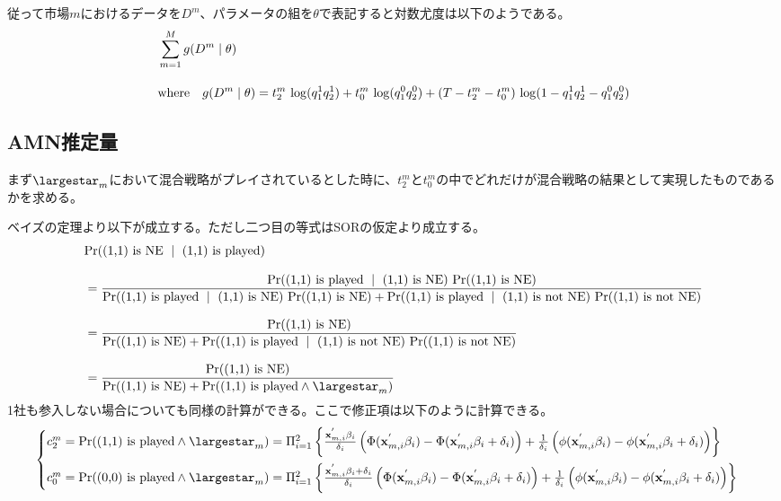 \documentclass{jsarticle}
\begin{document}
従って市場$m$におけるデータを$D^m$、パラメータの組を$\theta$で表記すると対数尤度は以下のようである。
\begin{align*}
	&\sum_{m = 1}^M g(D^m \mid \theta)\\[10pt]
	&\text{where}\quad g(D^m \mid \theta) = t_2^m\ {\rm log} (q_1^1 q_2^1) + t_0^m\ {\rm log} (q_1^0 q_2^0) + (T - t_2^m - t_0^m)\ {\rm log} (1- q_1^1 q_2^1 - q_1^0 q_2^0)
\end{align*}


\subsection{AMN推定量}
まず$\largestar_m$において混合戦略がプレイされているとした時に、$t_2^m$と$t_0^m$の中でどれだけが混合戦略の結果として実現したものであるかを求める。

ベイズの定理より以下が成立する。ただし二つ目の等式はSORの仮定より成立する。
\begin{align*}
	&{\rm Pr}(\text{(1,1) is NE}\ \mid\ \text{(1,1) is played}) \\[8pt]
	&= \frac{{\rm Pr}(\text{(1,1) is played}\ \mid\ \text{(1,1) is NE})\ {\rm Pr}(\text{(1,1) is NE})}{{\rm Pr}(\text{(1,1) is played}\ \mid\ \text{(1,1) is NE})\ {\rm Pr}(\text{(1,1) is NE}) + {\rm Pr}(\text{(1,1) is played}\ \mid\ \text{(1,1) is not NE})\ {\rm Pr}(\text{(1,1) is not NE})}\\[8pt]
	&= \frac{{\rm Pr}(\text{(1,1) is NE})}{{\rm Pr}(\text{(1,1) is NE}) + {\rm Pr}(\text{(1,1) is played}\ \mid\ \text{(1,1) is not NE})\ {\rm Pr}(\text{(1,1) is not NE})}\\[8pt]
	&= \frac{{\rm Pr}(\text{(1,1) is NE})}{{\rm Pr}(\text{(1,1) is NE}) + {\rm Pr}(\text{(1,1) is played} \wedge \largestar_m)}
\end{align*}
1社も参入しない場合についても同様の計算ができる。ここで修正項は以下のように計算できる。
\begin{align*}
\begin{cases}
	c_2^m = {\rm Pr}(\text{(1,1) is played} \wedge \largestar_m) = \Pi_{i = 1}^2 \left\{ \frac{{\bf x}_{m, i}^{'} \beta_i }{\delta_i} \left( \Phi({\bf x}_{m, i}^{'} \beta_i) - \Phi({\bf x}_{m, i}^{'} \beta_i  + \delta_i) \right) + \frac{1}{\delta_i} \left( \phi({\bf x}_{m, i}^{'} \beta_i ) - \phi({\bf x}_{m, i}^{'} \beta_i  + \delta_i) \right) \right\}\\[10pt]
	c_0^m = {\rm Pr}(\text{(0,0) is played} \wedge \largestar_m) = \Pi_{i = 1}^2 \left\{ \frac{{\bf x}_{m, i}^{'} \beta_i +\delta_i}{\delta_i} \left( \Phi({\bf x}_{m, i}^{'} \beta_i) - \Phi({\bf x}_{m, i}^{'} \beta_i  + \delta_i) \right) + \frac{1}{\delta_i} \left( \phi({\bf x}_{m, i}^{'} \beta_i ) - \phi({\bf x}_{m, i}^{'} \beta_i  + \delta_i) \right) \right\}
\end{cases}
\end{align*}
\end{document}
